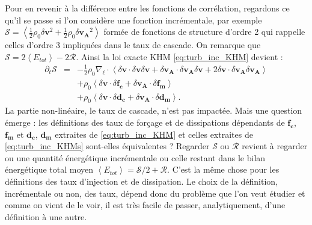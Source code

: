 Pour en revenir à la différence entre les fonctions de corrélation, regardons ce qu'il se passe si l'on considère une fonction incrémentale, par exemple $\mathcal{S} =  \left<\frac{1}{2} \rho_0 \delta \boldsymbol{v}^2 + \frac{1}{2} \rho_0 \delta \boldsymbol{v_A}^2\right>$ formée de fonctions de structure d'ordre 2 qui rappelle celles d'ordre 3 impliquées dans le taux de cascade. On remarque que $\mathcal{S} = 2\left<E_{tot}\right> - 2\mathcal{R}$. Ainsi la loi exacte KHM \eqref{eq:turb_inc_KHM} devient : 
\begin{eqnarray}
\label{eq:turb_inc_KHMs}    \partial_t \mathcal{S} &=& -\frac{1}{2} \rho_0 \nabla_{\boldsymbol{\ell}} \cdot \left< \delta \boldsymbol{v} \cdot \delta \boldsymbol{v} \delta \boldsymbol{v} + \delta \boldsymbol{v_A} \cdot \delta \boldsymbol{v_A} \delta \boldsymbol{v} + 2 \delta \boldsymbol{v} \cdot \delta \boldsymbol{v_A} \delta \boldsymbol{v_A}\right> \\
    &&+ \rho_0 \left<\delta \boldsymbol{v} \cdot \delta \boldsymbol{f_c} + \delta \boldsymbol{v_A} \cdot \delta \boldsymbol{f_m} \right> \\
    &&+ \rho_0 \left<\delta \boldsymbol{v} \cdot \delta \boldsymbol{d_c} + \delta \boldsymbol{v_A} \cdot \delta \boldsymbol{d_m}\right>.
\end{eqnarray}
La partie non-linéaire, le taux de cascade, n'est pas impactée. Mais une question émerge : les définitions des taux de forçage et de dissipations dépendants de $\boldsymbol{f_c}$, $\boldsymbol{f_m}$ et $\boldsymbol{d_c}$, $\boldsymbol{d_m}$ extraites de \eqref{eq:turb_inc_KHM} et celles extraites de \eqref{eq:turb_inc_KHMs} sont-elles équivalentes ? Regarder $\mathcal{S}$ ou $\mathcal{R}$ revient à regarder ou une quantité énergétique incrémentale ou celle restant dans le bilan énergétique total moyen $\left<E_{tot}\right> = \mathcal{S}/2 + \mathcal{R}$. C'est la même chose pour les définitions des taux d'injection et de dissipation. Le choix de la définition, incrémentale ou non, des taux, dépend donc du problème que l'on veut étudier et comme on vient de le voir, il est très facile de passer, analytiquement, d'une définition à une autre.  

\newpage
